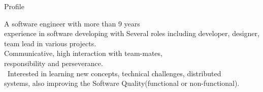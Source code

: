 
\begin{jrsection}[location = sidebar]{Profile}
    \begin{jrdescription}
    A software engineer with more than 9 years  \\
    experience in software developing with Several roles including developer, designer, team lead in various projects.\\
    Communicative, high interaction with team-mates,\\
    responsibility and perseverance.\\ \linebreak\
    Interested in learning new concepts, technical challenges, distributed \\
    systems, also improving the Software Quality(functional or non-functional).\\
    \end{jrdescription}
\end{jrsection}
